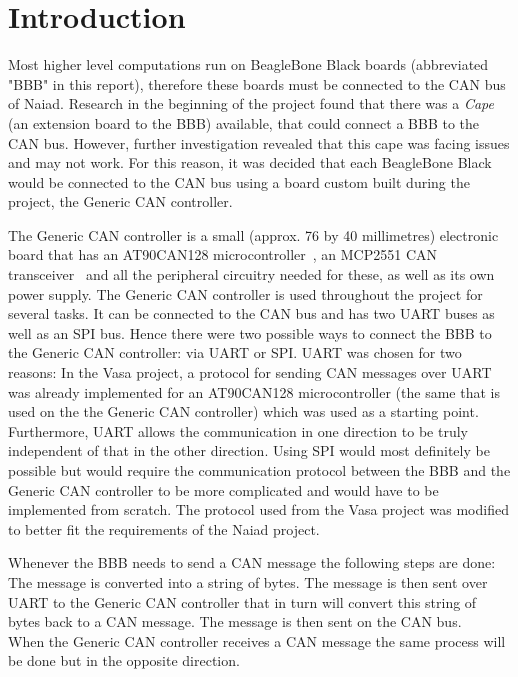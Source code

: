 
\section{Introduction}\label{sec:introduction}
Most higher level computations run on BeagleBone Black boards (abbreviated "BBB" in this report), therefore these boards must be connected to the CAN bus of Naiad. Research in the beginning of the project found that there was a \emph{Cape} (an extension board to the BBB) available, that could connect a BBB to the CAN bus. However, further investigation revealed that this cape was facing issues and may not work. For this reason, it was decided that each BeagleBone Black would be connected to the CAN bus using a board custom built during the project, the Generic CAN controller. \newline

The Generic CAN controller is a small (approx. 76 by 40 millimetres) electronic board that has an AT90CAN128 microcontroller~\cite{web:at90can}, an MCP2551 CAN transceiver~\cite{web:mcp2551} and all the peripheral circuitry needed for these, as well as its own power supply. The Generic CAN controller is used throughout the project for several tasks. It can be connected to the CAN bus and has two UART buses as well as an SPI bus. \newline
Hence there were two possible ways to connect the BBB to the Generic CAN controller: via UART or SPI. \newline
UART was chosen for two reasons: In the Vasa project, a protocol for sending CAN messages over UART was already implemented for an AT90CAN128 microcontroller (the same that is used on the the Generic CAN controller) which was used as a starting point. Furthermore, UART allows the communication in one direction to be truly independent of that in the other direction. Using SPI would most definitely be possible but would require the communication protocol between the BBB and the Generic CAN controller to be more complicated and would have to be implemented from scratch.  \newline
The protocol used from the Vasa project was modified to better fit the requirements of the Naiad project.

Whenever the BBB needs to send a CAN message the following steps are done: The message is converted into a string of bytes.  The message is then sent over UART to the Generic CAN controller that in turn will convert this string of bytes back to a CAN message. The message is then sent on the CAN bus. \\
When the Generic CAN controller receives a CAN message the same process will be done but in the opposite direction. 
